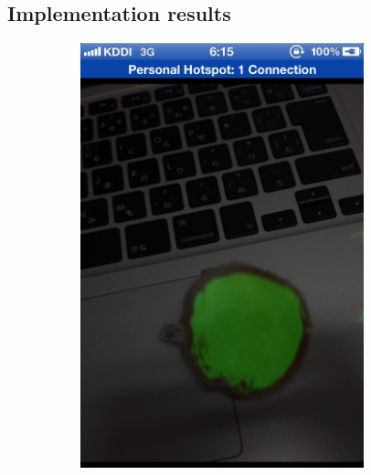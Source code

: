 \subsection{Implementation results}
\label{iresults}

\begin{figure}[ht]
    \centering

\begin{subfigure}[b]{.3\linewidth}
	   \includegraphics[width=0.9\textwidth]{images/IMG_1807.jpg}
\caption{}
\label{scre1}
	 \end{subfigure}
	\begin{subfigure}[b]{.3\linewidth}

\end{subfigure}
\end{figure}
